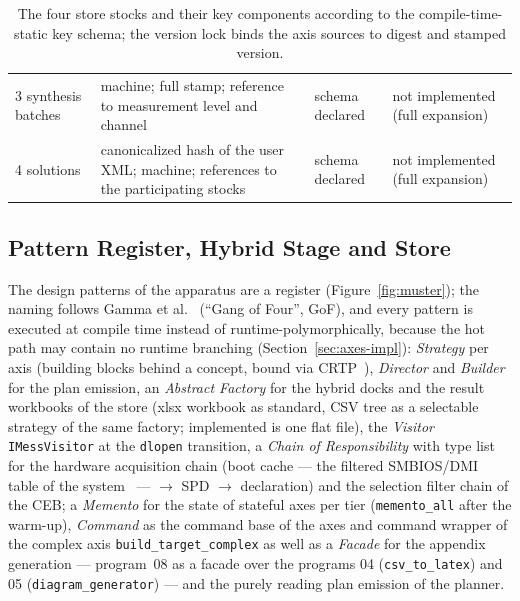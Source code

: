 \begin{nurlang}
\begin{table}[htbp]
\begin{tabular}{@{}lp{6.2cm}p{3.0cm}p{2.6cm}@{}}
3 synthesis batches & machine; full stamp; reference to measurement level and channel & schema declared & not implemented (full expansion) \\
4 solutions & canonicalized hash of the user XML\@; machine; references to the participating stocks & schema declared & not implemented (full expansion) \\
\bottomrule
\end{tabular}
\caption{The four store stocks and their key components according to the compile-time-static key
schema; the version lock binds the axis sources to digest and stamped
version.}\label{tab:lager-schluessel}
\end{table}
\end{nurlang}
\begin{nurkurz}
\subsection{Pattern Register, Hybrid Stage and Store}\label{sec:impl-hybrid-lager}
The design patterns of the apparatus are a register (Figure~\ref{fig:muster}); the naming follows Gamma
et al.~\cite{gamma1994patterns} (\enquote{Gang of Four}, GoF), and every pattern is executed at compile
time instead of runtime-polymorphically, because the hot path may contain no runtime branching
(Section~\ref{sec:axes-impl}): \emph{Strategy} per axis (building blocks behind a concept, bound via
CRTP~\cite{coplien1995crtp}), \emph{Director} and \emph{Builder} for the plan emission, an
\emph{Abstract Factory} for the hybrid docks and the result workbooks of the store (xlsx workbook as
standard, CSV tree as a selectable strategy of the same factory; implemented is one flat file), the
\emph{Visitor} \texttt{IMessVisitor} at the \texttt{dlopen} transition, a \emph{Chain of
Responsibility} with type list for the hardware acquisition chain (boot cache --- the filtered
SMBIOS/DMI table of the system~\cite{dmtf_smbios} --- $\to$ SPD $\to$ declaration) and the selection
filter chain of the CEB\@; a \emph{Memento} for the state of stateful axes per tier
(\texttt{memento\_all} after the warm-up), \emph{Command} as the command base of the axes and command
wrapper of the complex axis \texttt{build\_target\_complex} as well as a \emph{Facade} for the appendix
generation --- program~08 as a facade over the programs 04 (\texttt{csv\_to\_latex}) and 05
(\texttt{diagram\_generator}) --- and the purely reading plan emission of the planner.
\begin{figure}[htbp]\centering
\begin{tikzpicture}[font=\footnotesize,
  mu/.style={draw,rounded corners,fill=blue!7,minimum width=3.6cm,minimum height=2.55cm,text width=3.4cm,align=center,inner sep=2pt}]

\end{tikzpicture}
\end{figure}
\end{nurkurz}
